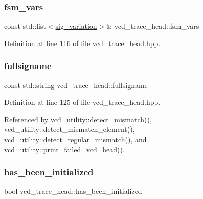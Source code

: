 \mbox{\label{structvcd__trace__head_a78c41220597abaf2c6f11b2174929666}} 
\subsubsection{\texorpdfstring{fsm\+\_\+vars}{fsm\_vars}}
{\footnotesize\ttfamily const std\+::list$<$\hyperlink{structsig__variation}{sig\+\_\+variation}$>$\& vcd\+\_\+trace\+\_\+head\+::fsm\+\_\+vars}



Definition at line 116 of file vcd\+\_\+trace\+\_\+head.\+hpp.

\mbox{\label{structvcd__trace__head_a8f424c51043c8252abcf4ff39c77c04e}} 
\subsubsection{\texorpdfstring{fullsigname}{fullsigname}}
{\footnotesize\ttfamily const std\+::string vcd\+\_\+trace\+\_\+head\+::fullsigname}



Definition at line 125 of file vcd\+\_\+trace\+\_\+head.\+hpp.



Referenced by vcd\+\_\+utility\+::detect\+\_\+mismatch(), vcd\+\_\+utility\+::detect\+\_\+mismatch\+\_\+element(), vcd\+\_\+utility\+::detect\+\_\+regular\+\_\+mismatch(), and vcd\+\_\+utility\+::print\+\_\+failed\+\_\+vcd\+\_\+head().

\mbox{\label{structvcd__trace__head_adb1635d0b8337b81a4a47f14eda31ab3}} 
\subsubsection{\texorpdfstring{has\+\_\+been\+\_\+initialized}{has\_been\_initialized}}
{\footnotesize\ttfamily bool vcd\+\_\+trace\+\_\+head\+::has\+\_\+been\+\_\+initialized}



